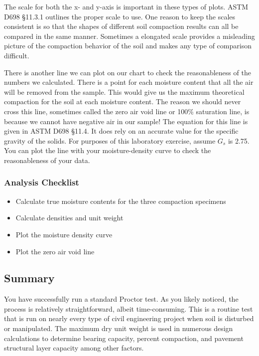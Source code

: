 \documentclass[12pt]{article}
\begin{document}
The scale for both the x- and y-axis is important in these types of plots. ASTM D698 \S11.3.1 outlines the proper scale to use. One reason to keep the scales consistent is so that the shapes of different soil compaction results can all be compared in the same manner. Sometimes a elongated scale provides a misleading picture of the compaction behavior of the soil and makes any type of comparison difficult.

There is another line we can plot on our chart to check the reasonableness of the numbers we calculated. There is a point for each moisture content that all the air will be removed from the sample. This would give us the maximum theoretical compaction for the soil at each moisture content. The reason we should never cross this line, sometimes called the zero air void line or 100\% saturation line, is because we cannot have negative air in our sample! The equation for this line is given in ASTM D698 \S11.4. It does rely on an accurate value for the specific gravity of the solids. For purposes of this laboratory exercise, assume $G_s$ is 2.75. You can plot the line with your moisture-density curve to check the reasonableness of your data.

\subsubsection*{Analysis Checklist}
\begin{itemize}
    \item Calculate true moisture contents for the three compaction specimens
    \item Calculate densities and unit weight
    \item Plot the moisture density curve
    \item Plot the zero air void line
\end{itemize}

\subsection{Summary}
You have successfully run a standard Proctor test. As you likely noticed, the process is relatively straightforward, albeit time-consuming. This is a routine test that is run on nearly every type of civil engineering project when soil is disturbed or manipulated. The maximum dry unit weight is used in numerous design calculations to determine bearing capacity, percent compaction, and pavement structural layer capacity among other factors.
\end{document}
